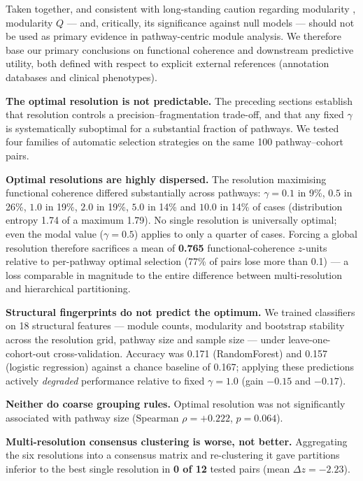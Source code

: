 \documentclass[twocolumn,10pt,a4paper]{article}
\begin{document}
Taken together, and consistent with long-standing caution regarding modularity
\citep{fortunato2007resolution,fortunato2010review}, modularity $Q$ --- and, critically, its
significance against null models --- should not be used as primary evidence in
pathway-centric module analysis. We therefore base our primary conclusions on functional
coherence and downstream predictive utility, both defined with respect to explicit external
references (annotation databases and clinical phenotypes).

\noindent\textbf{The optimal resolution is not predictable.} The preceding sections establish that resolution controls a precision--fragmentation
trade-off, and that any fixed $\gamma$ is systematically suboptimal for a substantial
fraction of pathways. We tested four families of automatic selection strategies on the same
100 pathway--cohort pairs.

\noindent\textbf{Optimal resolutions are highly dispersed.} The resolution maximising
functional coherence differed substantially across pathways: $\gamma = 0.1$ in 9\%,
$0.5$ in 26\%, $1.0$ in 19\%, $2.0$ in 19\%, $5.0$ in 14\% and $10.0$ in 14\% of cases
(distribution entropy 1.74 of a maximum 1.79). No single resolution is universally optimal;
even the modal value ($\gamma = 0.5$) applies to only a quarter of cases. Forcing a global
resolution therefore sacrifices a mean of \textbf{0.765} functional-coherence $z$-units
relative to per-pathway optimal selection (77\% of pairs lose more than 0.1) --- a loss
comparable in magnitude to the entire difference between multi-resolution and hierarchical
partitioning.

\noindent\textbf{Structural fingerprints do not predict the optimum.} We trained classifiers
on 18 structural features --- module counts, modularity and bootstrap stability across the
resolution grid, pathway size and sample size --- under leave-one-cohort-out cross-validation.
Accuracy was 0.171 (RandomForest) and 0.157 (logistic regression) against a chance baseline of
0.167; applying these predictions actively \emph{degraded} performance relative to fixed
$\gamma = 1.0$ (gain $-0.15$ and $-0.17$).

\noindent\textbf{Neither do coarse grouping rules.} Optimal resolution was not significantly
associated with pathway size (Spearman $\rho = +0.222$, $p = 0.064$).

\noindent\textbf{Multi-resolution consensus clustering is worse, not better.} Aggregating the
six resolutions into a consensus matrix and re-clustering it gave partitions inferior to the
best single resolution in \textbf{0 of 12} tested pairs (mean $\Delta z = -2.23$).
\end{document}

